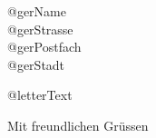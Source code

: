 \documentclass[
      SN,%
      refline=dateleft,
      firstfoot=false,
      enlargefirstpage,
      backaddress=false,
      foldmarks=false,
      parskip=half-
      ]{scrlttr2}
\begin{document}
      \begin{letter}{@gerName\\@gerStrasse\\@gerPostfach\\@gerStadt}
        \opening{@letterText}
        \closing{Mit freundlichen Grüssen}
      \end{letter}
    
\end{document}
